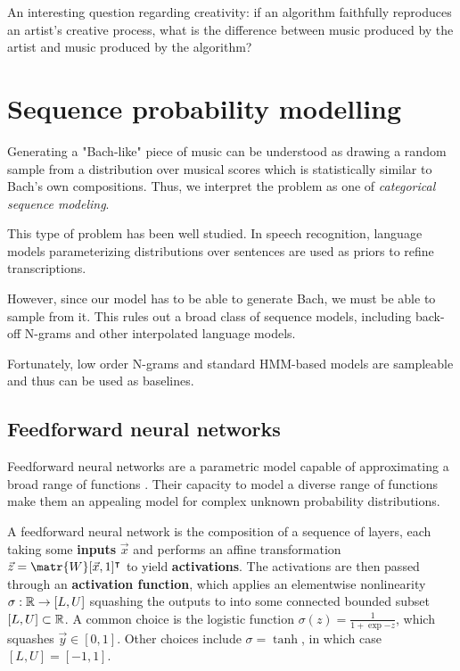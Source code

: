 An interesting question regarding creativity: if an algorithm faithfully reproduces
an artist's creative process, what is the difference between music produced by the artist
and music produced by the algorithm?

\section{Sequence probability modelling}

Generating a "Bach-like" piece of music can be understood as drawing a random
sample from a distribution over musical scores which is statistically similar
to Bach's own compositions. Thus, we interpret the problem as one of
\emph{categorical sequence modeling}.

This type of problem has been well studied. In speech recognition, language
models parameterizing distributions over sentences are used as priors to refine
transcriptions.

However, since our model has to be able to generate Bach, we must be able to
sample from it. This rules out a broad class of sequence models, including
back-off N-grams and other interpolated language models.

Fortunately, low order N-grams and standard HMM-based models are sampleable and
thus can be used as baselines.

\subsection{Feedforward neural networks}

Feedforward neural networks are a parametric model capable of approximating a
broad range of functions . Their capacity
to model a diverse range of functions make them an appealing model for complex
unknown probability distributions.

A feedforward neural network is the composition of a sequence of layers, each
taking some \textbf{inputs} $\vec{x}$ and performs an affine transformation $\vec{z} =
\matr{W} [\vec{x}, 1]^\tp$ to yield \textbf{activations}. The activations are then
passed through an \textbf{activation function}, which applies an elementwise
nonlinearity $\sigma : \mathbb{R} \to [L,U]$ squashing the outputs to into some connected bounded
subset $[L,U] \subset \mathbb{R}$. A common choice is the logistic function $\sigma(z)
= \frac{1}{1+\exp{-z}}$, which squashes $\vec{y} \in [0, 1]$. Other choices
include $\sigma = \tanh$, in which case $[L, U] = [-1, 1]$.

